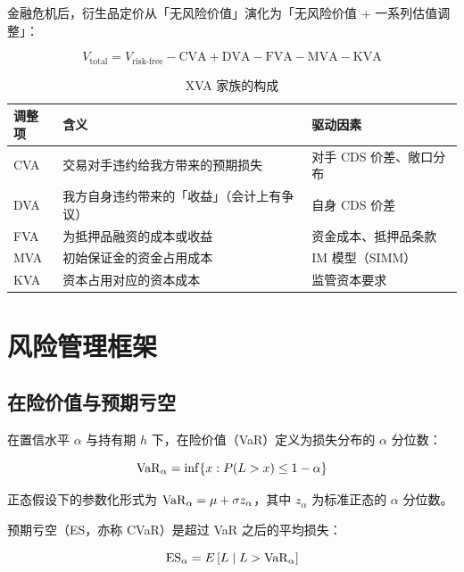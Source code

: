 金融危机后，衍生品定价从「无风险价值」演化为「无风险价值 + 一系列估值调整」：

\begin{equation}
  V_{\text{total}} = V_{\text{risk-free}} - \text{CVA} + \text{DVA} - \text{FVA} - \text{MVA} - \text{KVA}
  \label{eq:04-xva}
\end{equation}

\begin{table}[htbp]
\centering
\caption{XVA 家族的构成}\label{tab:04-xva}
\tablefont
\begin{tabularx}{\textwidth}{@{}L{1.6cm}Y L{3.4cm}@{}}
\toprule
\textbf{调整项} & \textbf{含义} & \textbf{驱动因素} \\
\midrule
CVA & 交易对手违约给我方带来的预期损失 & 对手 CDS 价差、敞口分布 \\
DVA & 我方自身违约带来的「收益」（会计上有争议） & 自身 CDS 价差 \\
FVA & 为抵押品融资的成本或收益 & 资金成本、抵押品条款 \\
MVA & 初始保证金的资金占用成本 & IM 模型（SIMM） \\
KVA & 资本占用对应的资本成本 & 监管资本要求 \\
\bottomrule
\end{tabularx}
\end{table}

\section{风险管理框架}

\subsection{在险价值与预期亏空}

在置信水平 $\alpha$ 与持有期 $h$ 下，在险价值（VaR）定义为损失分布的 $\alpha$ 分位数：

\begin{equation}
  \operatorname{VaR}_\alpha = \inf\{x : P(L > x) \le 1-\alpha\}
  \label{eq:04-var-def}
\end{equation}

正态假设下的参数化形式为 $\operatorname{VaR}_\alpha = \mu + \sigma z_\alpha$，其中 $z_\alpha$ 为标准正态的 $\alpha$ 分位数。

预期亏空（ES，亦称 CVaR）是超过 VaR 之后的平均损失：

\begin{equation}
  \operatorname{ES}_\alpha = E\left[L \mid L > \operatorname{VaR}_\alpha\right]
  \label{eq:04-es}
\end{equation}


